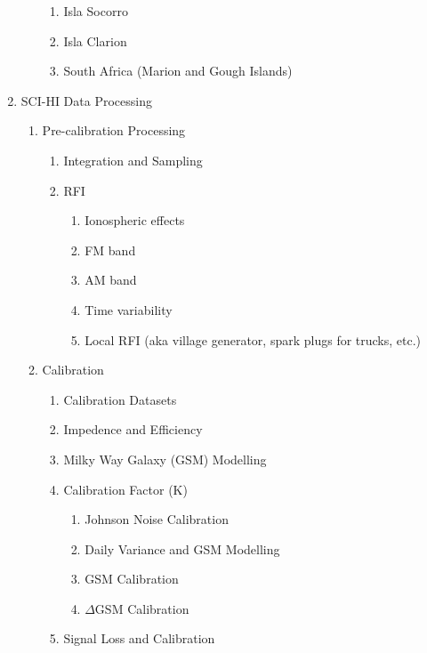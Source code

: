 \documentclass[12pt,twoside]{report}
\begin{document}
\begin{enumerate}
\begin{enumerate}
\begin{enumerate}
\item Isla Socorro
\item Isla Clarion
\item South Africa (Marion and Gough Islands)
\end{enumerate}

\end{enumerate}

\item SCI-HI Data Processing

\begin{enumerate}
\item Pre-calibration Processing

\begin{enumerate}
\item Integration and Sampling
\item RFI

\begin{enumerate}
\item Ionospheric effects
\item FM band
\item AM band
\item Time variability
\item Local RFI (aka village generator, spark plugs for trucks, etc.)
\end{enumerate}
\end{enumerate}

\item Calibration 

\begin{enumerate}
\item Calibration Datasets
\item Impedence and Efficiency
\item Milky Way Galaxy (GSM) Modelling
\item Calibration Factor (K)

\begin{enumerate}
\item Johnson Noise Calibration
\item Daily Variance and GSM Modelling
\item GSM Calibration
\item $\Delta$GSM Calibration

\end{enumerate}

\item \cm Signal Loss and Calibration

\end{enumerate}


\end{enumerate}
\end{enumerate}
\end{document}
